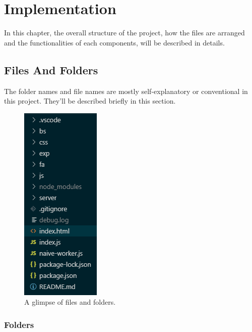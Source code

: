 
\chapter{Implementation} %

\label{Chapter4} %

In this chapter, the overall structure of the project, how the files are arranged and the functionalities of each components, will be described in details.


\section{Files And Folders}

The folder names and file names are mostly self-explanatory or conventional in this project. They'll be described briefly in this section.

\begin{figure}[th]
\centering
\includegraphics{Figures/Chapter4/filestructure.png}
\decoRule
\caption[File Structure]{A glimpse of files and folders.}
\label{fig:filestructure}
\end{figure}

\subsection{Folders}

